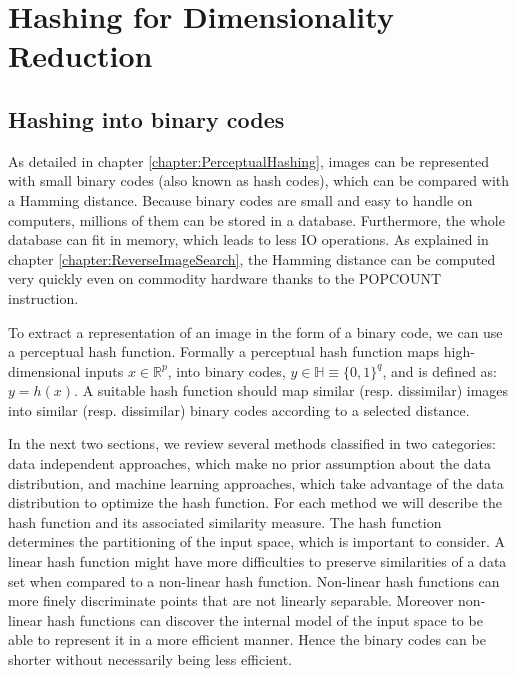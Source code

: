 \chapter{Hashing for Dimensionality Reduction}

\label{chapter:HashingDimensionalityReduction}


\section{Hashing into binary codes}
As detailed in chapter \ref{chapter:PerceptualHashing}, images can be represented with small binary codes (also known as hash codes), which can be compared with a Hamming distance. Because binary codes are small and easy to handle on computers, millions of them can be stored in a database. Furthermore, the whole database can fit in memory, which leads to less IO operations. As explained in chapter \ref{chapter:ReverseImageSearch}, the Hamming distance can be computed very quickly even on commodity hardware thanks to the POPCOUNT instruction.

To extract a representation of an image in the form of a binary code, we can use a perceptual hash function. Formally a perceptual hash function maps high-dimensional inputs $x\in\mathbb{R}^{p}$, into binary codes, $y\in\mathbb{H}\equiv\{0, 1\}^{q}$, and is defined as: $y=h(x)$. A suitable hash function should map similar (resp. dissimilar) images into similar (resp. dissimilar) binary codes according to a selected distance.

In the next two sections, we review several methods classified in two categories: data independent approaches, which make no prior assumption about the data distribution, and machine learning approaches, which take advantage of the data distribution to optimize the hash function. For each method we will describe the hash function and its associated similarity measure. The hash function determines the partitioning of the input space, which is important to consider. A linear hash function might have more difficulties to preserve similarities of a data set when compared to a non-linear hash function. Non-linear hash functions can more finely discriminate points that are not linearly separable. Moreover non-linear hash functions can discover the internal model of the input space to be able to represent it in a more efficient manner. Hence the binary codes can be shorter without necessarily being less efficient.

